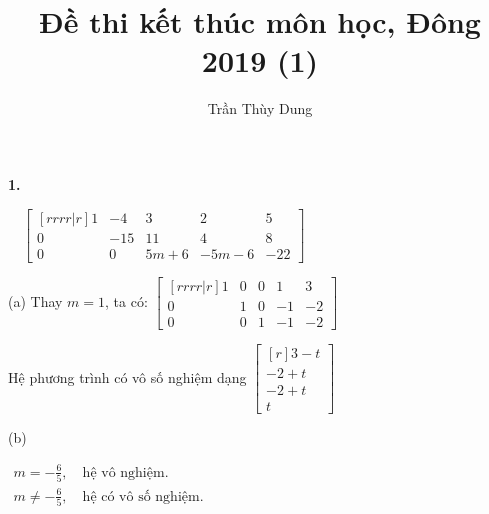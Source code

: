 \documentclass{article}
\title{Đề thi kết thúc môn học, Đông 2019 (1)}
\author{Trần Thùy Dung}
\date{}
\newcommand\ddfrac[2]{\frac{\displaystyle #1}{\displaystyle #2}}
\begin{document}
    \maketitle

    \begin{minipage}[t]{0.45\linewidth}
    \textbf{1.}

    $\quad \begin{bmatrix}[rrrr|r]
        1  & -4 & 3 & 2 & 5 \\
        0 & -15 & 11 & 4 & 8 \\
        0 & 0 & 5m+6 & -5m-6 & -22
    \end{bmatrix} $

    (a) Thay $m = 1$, ta có:
    $ \begin{bmatrix}[rrrr|r]
        1 & 0 & 0 & 1 & 3 \\
        0 & 1 & 0 & -1  & -2 \\
        0 & 0 & 1 & -1 & -2 
    \end{bmatrix} $

    Hệ phương trình có vô số nghiệm dạng $ \begin{bmatrix}[r]
        3 - t \\
        -2 + t \\
        -2 + t \\
        t 
    \end{bmatrix} $

    (b) 

    $ \begin{array}{l}
     m = - \ddfrac{6}{5} , \quad \text {hệ vô nghiệm}. \\
        m \ne - \ddfrac{6}{5} ,\quad \text{hệ có vô số nghiệm.} 
    \end{array}$



        
    \end{minipage}
\end{document}
